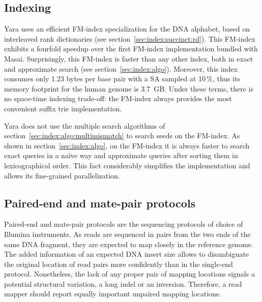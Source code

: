 
\subsection{Indexing}
\label{sec:yara:eng:indexing}

Yara uses an efficient FM-index specialization for the DNA alphabet, based on interleaved rank dictionaries (see section~\ref{sec:index:succinct:rd}).
This FM-index exhibits a fourfold speedup over the first FM-index implementation bundled with Masai.
Surprisingly, this FM-index is faster than any other index, both in exact and approximate search (see section~\ref{sec:index:algo}).
Moreover, this index consumes only 1.23 bytes per base pair with a SA sampled at 10\,\%, thus its memory footprint for the human genome is 3.7~GB.
Under these terms, there is no space-time indexing trade-off: the FM-index always provides the most convenient suffix trie implementation.

Yara does not use the multiple search algorithms of section~\ref{sec:index:algo:multimismatch} to search seeds on the FM-index.
As shown in section~\ref{sec:index:algo}, on the FM-index it is always faster to search exact queries in a na\"ive way and approximate queries after sorting them in lexicographical order.
This fact considerably simplifies the implementation and allows its fine-grained parallelization.



\subsection{Paired-end and mate-pair protocols}
\label{sec:yara:eng:pairs}
Paired-end and mate-pair protocols are the sequencing protocols of choice of Illumina instruments.
As reads are sequenced in pairs from the two ends of the same DNA fragment, they are expected to map closely in the reference genome.
The added information of an expected DNA insert size allows to disambiguate the original location of read pairs more confidently than in the single-end protocol.
Nonetheless, the lack of any proper pair of mapping locations signals a potential structural variation, \eg a long indel or an inversion.
Therefore, a read mapper should report equally important unpaired mapping locations.

